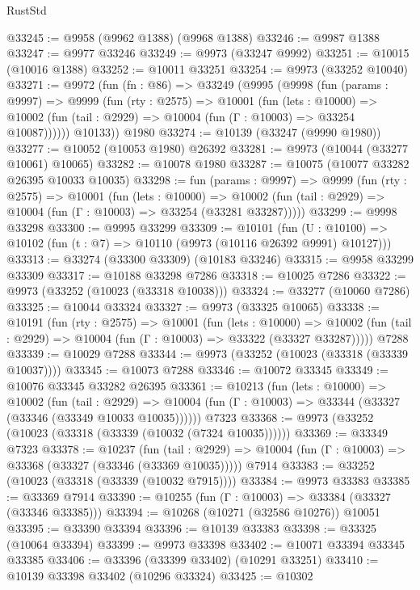 \begin{lexlean}{RustStd}
\begin{coremodule}
@33245 := @9958 (@9962 @1388) (@9968 @1388)
@33246 := @9987 @1388
@33247 := @9977 @33246
@33249 := @9973 (@33247 @9992)
@33251 := @10015 (@10016 @1388)
@33252 := @10011 @33251
@33254 := @9973 (@33252 @10040)
@33271 := @9972
    (fun (fn : @86) =>
    @33249
      (@9995
        (@9998
          (fun (params : @9997) =>
          @9999
            (fun (rty : @2575) =>
            @10001
              (fun (lets : @10000) =>
              @10002 (fun (tail : @2929) => @10004 (fun (Γ : @10003) => @33254 @10087))))))
        @10133))
    @1980
@33274 := @10139 (@33247 (@9990 @1980))
@33277 := @10052 (@10053 @1980) @26392
@33281 := @9973 (@10044 (@33277 @10061) @10065)
@33282 := @10078 @1980
@33287 := @10075 (@10077 @33282 @26395 @10033 @10035)
@33298 := fun (params : @9997) =>
  @9999
    (fun (rty : @2575) =>
    @10001
      (fun (lets : @10000) =>
      @10002 (fun (tail : @2929) => @10004 (fun (Γ : @10003) => @33254 (@33281 @33287)))))
@33299 := @9998 @33298
@33300 := @9995 @33299
@33309 := @10101
    (fun (U : @10100) => @10102 (fun (t : @7) => @10110 (@9973 (@10116 @26392 @9991) @10127)))
@33313 := @33274 (@33300 @33309) (@10183 @33246)
@33315 := @9958 @33299 @33309
@33317 := @10188 @33298 @7286
@33318 := @10025 @7286
@33322 := @9973 (@33252 (@10023 (@33318 @10038)))
@33324 := @33277 (@10060 @7286)
@33325 := @10044 @33324
@33327 := @9973 (@33325 @10065)
@33338 := @10191
    (fun (rty : @2575) =>
    @10001
      (fun (lets : @10000) =>
      @10002 (fun (tail : @2929) => @10004 (fun (Γ : @10003) => @33322 (@33327 @33287)))))
    @7288
@33339 := @10029 @7288
@33344 := @9973 (@33252 (@10023 (@33318 (@33339 @10037))))
@33345 := @10073 @7288
@33346 := @10072 @33345
@33349 := @10076 @33345 @33282 @26395
@33361 := @10213
    (fun (lets : @10000) =>
    @10002
      (fun (tail : @2929) =>
      @10004 (fun (Γ : @10003) => @33344 (@33327 (@33346 (@33349 @10033 @10035))))))
    @7323
@33368 := @9973 (@33252 (@10023 (@33318 (@33339 (@10032 (@7324 @10035))))))
@33369 := @33349 @7323
@33378 := @10237
    (fun (tail : @2929) => @10004 (fun (Γ : @10003) => @33368 (@33327 (@33346 (@33369 @10035)))))
    @7914
@33383 := @33252 (@10023 (@33318 (@33339 (@10032 @7915))))
@33384 := @9973 @33383
@33385 := @33369 @7914
@33390 := @10255 (fun (Γ : @10003) => @33384 (@33327 (@33346 @33385)))
@33394 := @10268 (@10271 (@32586 @10276)) @10051
@33395 := @33390 @33394
@33396 := @10139 @33383
@33398 := @33325 (@10064 @33394)
@33399 := @9973 @33398
@33402 := @10071 @33394 @33345 @33385
@33406 := @33396 (@33399 @33402) (@10291 @33251)
@33410 := @10139 @33398 @33402 (@10296 @33324)
@33425 := @10302

\end{coremodule}
\end{lexlean}
